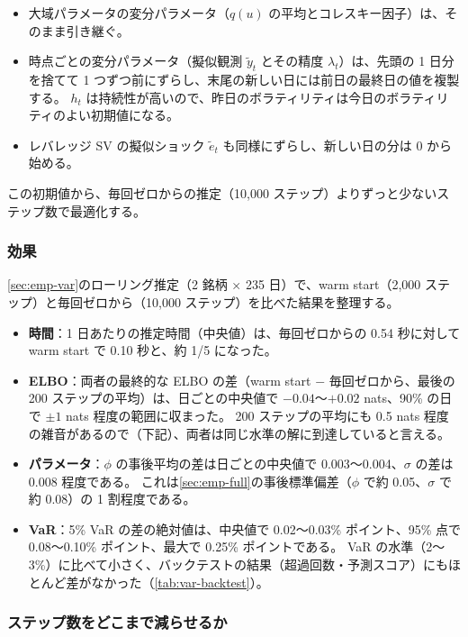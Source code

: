 \begin{itemize}
  \item 大域パラメータの変分パラメータ（$q(u)$ の平均とコレスキー因子）は、そのまま引き継ぐ。
  \item 時点ごとの変分パラメータ（擬似観測 $\tilde y_t$ とその精度 $\lambda_t$）は、先頭の 1 日分を捨てて 1 つずつ前にずらし、末尾の新しい日には前日の最終日の値を複製する。
    $h_t$ は持続性が高いので、昨日のボラティリティは今日のボラティリティのよい初期値になる。
  \item レバレッジ SV の擬似ショック $\tilde e_t$ も同様にずらし、新しい日の分は 0 から始める。
\end{itemize}

この初期値から、毎回ゼロからの推定（10,000 ステップ）よりずっと少ないステップ数で最適化する。

\subsubsection{効果}

\cref{sec:emp-var}のローリング推定（2 銘柄 × 235 日）で、warm start（2,000 ステップ）と毎回ゼロから（10,000 ステップ）を比べた結果を整理する。

\begin{itemize}
  \item \textbf{時間}：1 日あたりの推定時間（中央値）は、毎回ゼロからの 0.54 秒に対して warm start で 0.10 秒と、約 1/5 になった。
  \item \textbf{ELBO}：両者の最終的な ELBO の差（warm start $-$ 毎回ゼロから、最後の 200 ステップの平均）は、日ごとの中央値で $-0.04$〜$+0.02$ nats、90\% の日で $\pm 1$ nats 程度の範囲に収まった。
    200 ステップの平均にも 0.5 nats 程度の雑音があるので（下記）、両者は同じ水準の解に到達していると言える。
  \item \textbf{パラメータ}：$\phi$ の事後平均の差は日ごとの中央値で 0.003〜0.004、$\sigma$ の差は 0.008 程度である。
    これは\cref{sec:emp-full}の事後標準偏差（$\phi$ で約 0.05、$\sigma$ で約 0.08）の 1 割程度である。
  \item \textbf{VaR}：5\% VaR の差の絶対値は、中央値で 0.02〜0.03\% ポイント、95\% 点で 0.08〜0.10\% ポイント、最大で 0.25\% ポイントである。
    VaR の水準（2〜3\%）に比べて小さく、バックテストの結果（超過回数・予測スコア）にもほとんど差がなかった（\cref{tab:var-backtest}）。
\end{itemize}

\subsubsection{ステップ数をどこまで減らせるか}

